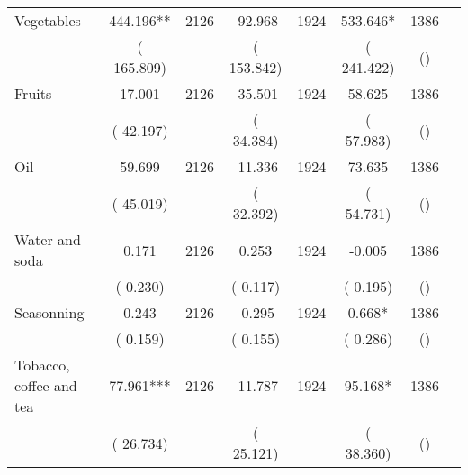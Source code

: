 \begin{tabular}{l*{6}{c}}
Vegetables        &            444.196**      &       2126       &            -92.968      &       1924       &            533.646*      &       1386  &  &              \\
                       &       (     165.809)            &                               &       (     153.842)            &                               &       (     241.422)            &       () &                  \\
Fruits        &             17.001      &       2126       &            -35.501      &       1924       &             58.625      &       1386  &  &              \\
                       &       (      42.197)            &                               &       (      34.384)            &                               &       (      57.983)            &       () &                  \\
Oil        &             59.699      &       2126       &            -11.336      &       1924       &             73.635      &       1386  &  &              \\
                       &       (      45.019)            &                               &       (      32.392)            &                               &       (      54.731)            &       () &                  \\
Water and soda        &              0.171      &       2126       &              0.253      &       1924       &             -0.005      &       1386  &  &              \\
                       &       (       0.230)            &                               &       (       0.117)            &                               &       (       0.195)            &       () &                  \\
Seasonning        &              0.243      &       2126       &             -0.295      &       1924       &              0.668*      &       1386  &  &              \\
                       &       (       0.159)            &                               &       (       0.155)            &                               &       (       0.286)            &       () &                  \\
Tobacco, coffee and tea        &             77.961***      &       2126       &            -11.787      &       1924       &             95.168*      &       1386  &  &              \\
                       &       (      26.734)            &                               &       (      25.121)            &                               &       (      38.360)            &       () &                  \\

\end{tabular}
